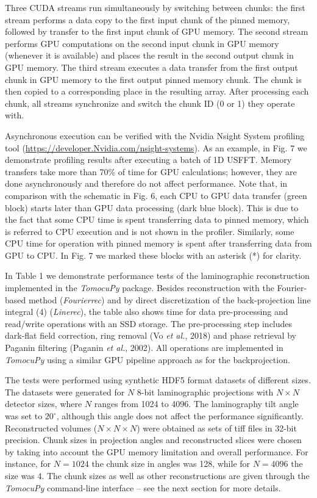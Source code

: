 \documentclass{article}
\begin{document}
Three CUDA streams run simultaneously by switching between chunks: the first stream performs a data copy to the first input chunk of the pinned memory, followed by transfer to the first input chunk of GPU memory. The second stream performs GPU computations on the second input chunk in GPU memory (whenever it is available) and places the result in the second output chunk in GPU memory. The third stream executes a data transfer from the first output chunk in GPU memory to the first output pinned memory chunk. The chunk is then copied to a corresponding place in the resulting array. After processing each chunk, all streams synchronize and switch the chunk ID (0 or 1) they operate with.

Asynchronous execution can be verified with the Nvidia Nsight System profiling tool (\url{https://developer.Nvidia.com/nsight-systems}). As an example, in Fig. 7 we demonstrate profiling results after executing a batch of 1D USFFT. Memory transfers take more than 70\% of time for GPU calculations; however, they are done asynchronously and therefore do not affect performance. Note that, in comparison with the schematic in Fig. 6, each CPU to GPU data transfer (green block) starts later than GPU data processing (dark blue block). This is due to the fact that some CPU time is spent transferring data to pinned memory, which is referred to CPU execution and is not shown in the profiler. Similarly, some CPU time for operation with pinned memory is spent after transferring data from GPU to CPU. In Fig. 7 we marked these blocks with an asterisk (*) for clarity.

In Table 1 we demonstrate performance tests of the laminographic reconstruction implemented in the \emph{TomocuPy} package. Besides reconstruction with the Fourier-based method (\emph{Fourierrec}) and by direct discretization of the back-projection line integral (4) (\emph{Linerec}), the table also shows time for data pre-processing and read/write operations with an SSD storage. The pre-processing step includes dark-flat field correction, ring removal (Vo \emph{et al.}, 2018) and phase retrieval by Paganin filtering (Paganin \emph{et al.}, 2002). All operations are implemented in \emph{TomocuPy} using a similar GPU pipeline approach as for the backprojection.

The tests were performed using synthetic HDF5 format datasets of different sizes. The datasets were generated for $N$ 8-bit laminographic projections with $N \times N$ detector sizes, where $N$ ranges from 1024 to 4096. The laminography tilt angle was set to $20^\circ$, although this angle does not affect the performance significantly. Reconstructed volumes ($N \times N \times N$) were obtained as sets of tiff files in 32-bit precision. Chunk sizes in projection angles and reconstructed slices were chosen by taking into account the GPU memory limitation and overall performance. For instance, for $N = 1024$ the chunk size in angles was 128, while for $N = 4096$ the size was 4. The chunk sizes as well as other reconstructions are given through the \emph{TomocuPy} command-line interface – see the next section for more details.
\end{document}
